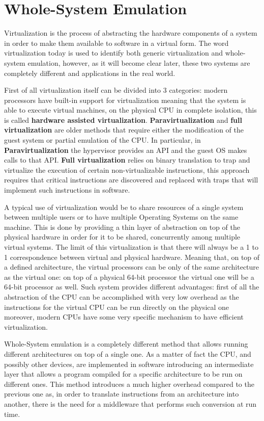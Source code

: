 \chapter{Whole-System Emulation}
\label{chap:3}

Virtualization is the process of abstracting the hardware components of a system in order to make them available to software in a virtual form.
The word virtualization today is used to identify both generic virtualization and whole-system emulation, however, as it will become clear later, these two systems are completely different and applications in the real world.

First of all virtualization itself can be divided into 3 categories: modern processors have built-in support for virtualization meaning that the system is able to execute virtual machines, on the physical CPU in complete isolation, this is called \textbf{hardware assisted virtualization}. \textbf{Paravirtualization} and \textbf{full virtualization} are older methods that require either the modification of the guest system or partial emulation of the CPU. In particular, in \textbf{Paravirtualization} the hypervisor provides an API and the guest OS makes calls to that API. \textbf{Full virtualization} relies on binary translation to trap and virtualize the execution of certain non-virtualizable instructions, this approach requires that critical instructions are discovered and replaced with traps that will implement such instructions in software.

A typical use of virtualization would be to share resources of a single system between multiple users or to have multiple Operating Systems on the same machine. This is done by providing a thin layer of abstraction on top of the physical hardware in order for it to be shared, concurrently among multiple virtual systems. The limit of this virtualization is that there will always be a 1 to 1 correspondence between virtual and physical hardware. Meaning that, on top of a defined architecture, the virtual processors can be only of the same architecture as the virtual one: on top of a physical 64-bit processor the virtual one will be a 64-bit processor as well. Such system provides different advantages: first of all the abstraction of the CPU can be accomplished with very low overhead as the instructions for the virtual CPU can be run directly on the physical one moreover, modern CPUs have some very specific mechanism to have efficient virtualization.

Whole-System emulation is a completely different method that allows running different architectures on top of a single one. As a matter of fact the CPU, and possibly other devices, are implemented in software introducing an intermediate layer that allows a program compiled for a specific architecture to be run on different ones. This method introduces a much higher overhead compared to the previous one as, in order to translate instructions from an architecture into another, there is the need for a middleware that performs such conversion at run time.

